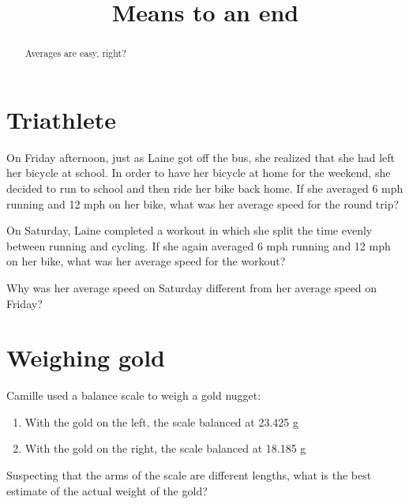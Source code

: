 \documentclass[handout,space,nooutcomes]{ximera}
\title{Means to an end}
\begin{document}
\begin{abstract}
Averages are easy, right?
\end{abstract}
\maketitle

\section*{Triathlete}

\begin{question}
On Friday afternoon, just as Laine got off the bus, she realized that
she had left her bicycle at school.  In order to have her bicycle at
home for the weekend, she decided to run to school and then ride her
bike back home.  If she averaged 6 mph running and 12 mph on her bike,
what was her average speed for the round trip?
\begin{freeResponse}
\end{freeResponse}
\end{question}

\begin{question}
On Saturday, Laine completed a workout in which she split the time
evenly between running and cycling.  If she again averaged 6 mph
running and 12 mph on her bike, what was her average speed for the
workout?
\begin{freeResponse}
\end{freeResponse}
\end{question}


\break

\begin{question}
Why was her average speed on Saturday different from her average speed
on Friday?
\begin{freeResponse}
\end{freeResponse}
\end{question}

\section*{Weighing gold}
 
\begin{question}
Camille used a balance scale to weigh a gold nugget:
\begin{enumerate}
\item With the gold on the left, the scale balanced at 23.425 g
\item With the gold on the right, the scale balanced at 18.185 g
\end{enumerate}
Suspecting that the arms of the scale are different lengths, what is
the best estimate of the actual weight of the gold?
\begin{freeResponse}
\end{freeResponse}
\end{question}
\end{document}
